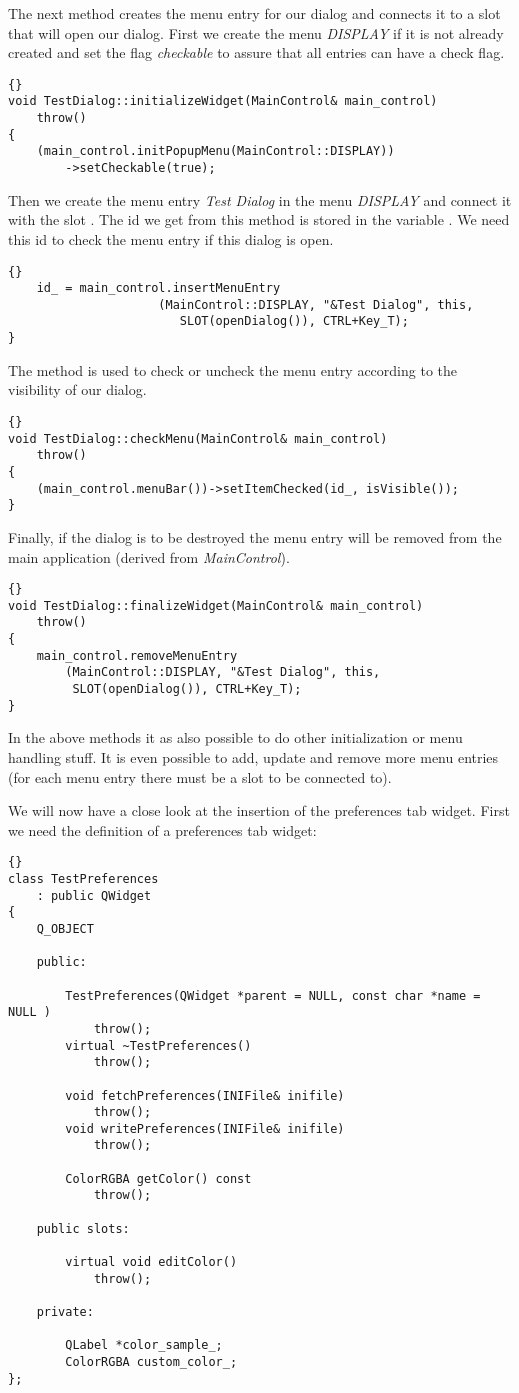 The next method creates the menu entry for our dialog and connects it to a slot
that will open our dialog. First we create the menu {\em DISPLAY} if it is not
already created and set the flag {\em checkable} to assure that all entries
can have a check flag.
\begin{lstlisting}{}
void TestDialog::initializeWidget(MainControl& main_control)
	throw()
{
	(main_control.initPopupMenu(MainControl::DISPLAY))
		->setCheckable(true);
\end{lstlisting}
Then we create the menu entry {\em Test Dialog} in the menu {\em DISPLAY} and
connect it with the slot . The id we get from
this method is stored in the variable . We need this
id to check the menu entry if this dialog is open.
\begin{lstlisting}{}
	id_ = main_control.insertMenuEntry
					 (MainControl::DISPLAY, "&Test Dialog", this,
						SLOT(openDialog()), CTRL+Key_T);   
}
\end{lstlisting}

The method  is used to check or uncheck the menu entry
according to the visibility of our dialog.
\begin{lstlisting}{}
void TestDialog::checkMenu(MainControl& main_control)
	throw()
{
	(main_control.menuBar())->setItemChecked(id_, isVisible());
}
\end{lstlisting}

Finally, if the dialog is to be destroyed the menu entry will be removed from
the main application (derived from {\em MainControl}).
\begin{lstlisting}{}
void TestDialog::finalizeWidget(MainControl& main_control)
	throw()
{
	main_control.removeMenuEntry
		(MainControl::DISPLAY, "&Test Dialog", this,
		 SLOT(openDialog()), CTRL+Key_T);   
}
\end{lstlisting}

In the above methods it as also possible to do other initialization or menu handling stuff.
It is even possible to add, update and remove more menu entries (for each menu entry
there must be a slot to be connected to).

We will now have a close look at the insertion of the preferences tab widget.
First we need the definition of a preferences tab widget:
\begin{lstlisting}{}
class TestPreferences 
	: public QWidget
{
	Q_OBJECT
		
	public:

		TestPreferences(QWidget *parent = NULL, const char *name = NULL )
			throw();
		virtual ~TestPreferences()
			throw();
		
		void fetchPreferences(INIFile& inifile)
			throw();
		void writePreferences(INIFile& inifile)
			throw();

		ColorRGBA getColor() const 
			throw();

	public slots:

		virtual void editColor()
			throw();

	private:

		QLabel *color_sample_;
		ColorRGBA custom_color_;
};
\end{lstlisting}

